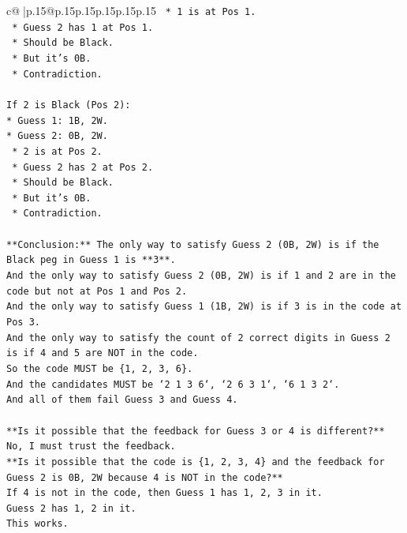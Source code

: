 \documentclass{article}
\begin{document}
{\begin{supertabular}{c@{$\;$}|p{.15\linewidth}@{}p{.15\linewidth}p{.15\linewidth}p{.15\linewidth}p{.15\linewidth}p{.15\linewidth}}
{{{\texttt{    *   1 is at Pos 1.} \\
\texttt{    *   Guess 2 has 1 at Pos 1.} \\
\texttt{    *   Should be Black.} \\
\texttt{    *   But it's 0B.} \\
\texttt{    *   Contradiction.} \\
\\ 
\texttt{If 2 is Black (Pos 2):} \\
\texttt{*   Guess 1: 1B, 2W.} \\
\texttt{*   Guess 2: 0B, 2W.} \\
\texttt{    *   2 is at Pos 2.} \\
\texttt{    *   Guess 2 has 2 at Pos 2.} \\
\texttt{    *   Should be Black.} \\
\texttt{    *   But it's 0B.} \\
\texttt{    *   Contradiction.} \\
\\ 
\texttt{**Conclusion:** The only way to satisfy Guess 2 (0B, 2W) is if the Black peg in Guess 1 is **3**.} \\
\texttt{And the only way to satisfy Guess 2 (0B, 2W) is if 1 and 2 are in the code but not at Pos 1 and Pos 2.} \\
\texttt{And the only way to satisfy Guess 1 (1B, 2W) is if 3 is in the code at Pos 3.} \\
\texttt{And the only way to satisfy the count of 2 correct digits in Guess 2 is if 4 and 5 are NOT in the code.} \\
\texttt{So the code MUST be \{1, 2, 3, 6\}.} \\
\texttt{And the candidates MUST be `2 1 3 6`, `2 6 3 1`, `6 1 3 2`.} \\
\texttt{And all of them fail Guess 3 and Guess 4.} \\
\\ 
\texttt{**Is it possible that the feedback for Guess 3 or 4 is different?**} \\
\texttt{No, I must trust the feedback.} \\
\texttt{**Is it possible that the code is \{1, 2, 3, 4\} and the feedback for Guess 2 is 0B, 2W because 4 is NOT in the code?**} \\
\texttt{If 4 is not in the code, then Guess 1 has 1, 2, 3 in it.} \\
\texttt{Guess 2 has 1, 2 in it.} \\
\texttt{This works.} \\
}}}
\end{supertabular}}
\end{document}
